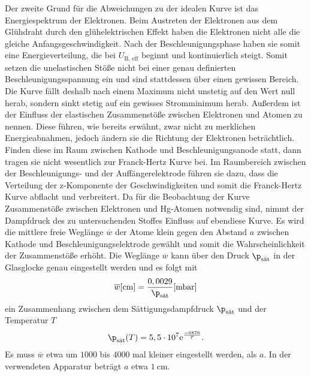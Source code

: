 \noindent
Der zweite Grund für die Abweichungen zu der idealen Kurve ist das Energiespektrum der Elektronen. Beim Austreten der Elektronen aus dem Glühdraht durch den glühelektrischen Effekt haben die Elektronen nicht alle die gleiche Anfangsgeschwindigkeit.
Nach der Beschleunigungsphase haben sie somit eine Energieverteilung, die bei $U_{\text{B, eff}}$ beginnt und kontinuierlich steigt. Somit setzen die unelastischen Stöße nicht bei einer genau definierten Beschleunigungsspannung ein und sind stattdessen über einen gewissen Bereich.
Die Kurve fällt deshalb nach einem Maximum nicht unstetig auf den Wert null herab, sondern sinkt stetig auf ein gewisses Stromminimum herab.
Außerdem ist der Einfluss der elastischen Zusammenstöße zwischen Elektronen und Atomen zu nennen. Diese führen, wie bereits erwähnt, zwar nicht zu merklichen Energieabnahmen, jedoch ändern sie die Richtung der Elektronen beträchtlich.
Finden diese im Raum zwischen Kathode und Beschleunigungsanode statt, dann tragen sie nicht wesentlich zur Franck-Hertz Kurve bei. Im Raumbereich zwischen der Beschleunigungs- und der Auffängerelektrode führen sie dazu, dass die Verteilung der z-Komponente der Geschwindigkeiten und somit die Franck-Hertz Kurve abflacht und verbreitert.
Da für die Beobachtung der Kurve Zusammenstöße zwischen Elektronen und Hg-Atomen notwendig sind, nimmt der Dampfdruck des zu untersuchenden Stoffes Einfluss auf ebendiese Kurve.
Es wird die mittlere freie Weglänge $\overline w$ der Atome klein gegen den Abstand $a$ zwischen Kathode und Beschleunigungselektrode gewählt und somit die Wahrscheinlichkeit der Zusammenstöße erhöht. Die Weglänge $\overline w$ kann über den Druck $\p_{\text{sät}}$
in der Glasglocke genau eingestellt werden und es folgt mit
\begin{align*}
    \overline w [\si{\centi\meter}] = \frac{0,0029}{\p_{\text{sät}}} [\si{\milli\bar}]
\end{align*}
ein Zusammenhang zwischen dem Sättigungsdampfdruck $\p_{\text{sät}}$ und der Temperatur $T$
\begin{align}
    \p_{\text{sät}}(T) = 5,5\cdot 10^{7} \text e^{\frac{-6876}{T}}.
\end{align}
Es muss $\overline w$ etwa um $1000$ bis $4000$ mal kleiner eingestellt werden, als $a$. In der verwendeten Apparatur beträgt $a$ etwa $\SI{1}{\centi\meter}$.